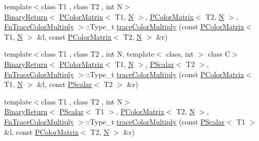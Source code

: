 \begin{DoxyCompactItemize}
\item 
{\footnotesize template$<$class T1 , class T2 , int N$>$ }\\\mbox{\hyperlink{structENSEM_1_1BinaryReturn}{Binary\+Return}}$<$ \mbox{\hyperlink{classENSEM_1_1PColorMatrix}{P\+Color\+Matrix}}$<$ T1, \mbox{\hyperlink{operator__name__util_8cc_a7722c8ecbb62d99aee7ce68b1752f337}{N}} $>$, \mbox{\hyperlink{classENSEM_1_1PColorMatrix}{P\+Color\+Matrix}}$<$ T2, \mbox{\hyperlink{operator__name__util_8cc_a7722c8ecbb62d99aee7ce68b1752f337}{N}} $>$, \mbox{\hyperlink{structENSEM_1_1FnTraceColorMultiply}{Fn\+Trace\+Color\+Multiply}} $>$\+::Type\+\_\+t \mbox{\hyperlink{group__primcolormatrix_ga690c734a59a0c81041165c0fe948ef2d}{trace\+Color\+Multiply}} (const \mbox{\hyperlink{classENSEM_1_1PColorMatrix}{P\+Color\+Matrix}}$<$ T1, \mbox{\hyperlink{operator__name__util_8cc_a7722c8ecbb62d99aee7ce68b1752f337}{N}} $>$ \&l, const \mbox{\hyperlink{classENSEM_1_1PColorMatrix}{P\+Color\+Matrix}}$<$ T2, \mbox{\hyperlink{operator__name__util_8cc_a7722c8ecbb62d99aee7ce68b1752f337}{N}} $>$ \&r)
\item 
{\footnotesize template$<$class T1 , class T2 , int N, template$<$ class, int $>$ class C$>$ }\\\mbox{\hyperlink{structENSEM_1_1BinaryReturn}{Binary\+Return}}$<$ \mbox{\hyperlink{classENSEM_1_1PColorMatrix}{P\+Color\+Matrix}}$<$ T1, \mbox{\hyperlink{operator__name__util_8cc_a7722c8ecbb62d99aee7ce68b1752f337}{N}} $>$, \mbox{\hyperlink{classENSEM_1_1PScalar}{P\+Scalar}}$<$ T2 $>$, \mbox{\hyperlink{structENSEM_1_1FnTraceColorMultiply}{Fn\+Trace\+Color\+Multiply}} $>$\+::Type\+\_\+t \mbox{\hyperlink{group__primcolormatrix_gac1ebb50e5da5705b401fc6a361b951c5}{trace\+Color\+Multiply}} (const \mbox{\hyperlink{classENSEM_1_1PColorMatrix}{P\+Color\+Matrix}}$<$ T1, \mbox{\hyperlink{operator__name__util_8cc_a7722c8ecbb62d99aee7ce68b1752f337}{N}} $>$ \&l, const \mbox{\hyperlink{classENSEM_1_1PScalar}{P\+Scalar}}$<$ T2 $>$ \&r)
\item 
{\footnotesize template$<$class T1 , class T2 , int N$>$ }\\\mbox{\hyperlink{structENSEM_1_1BinaryReturn}{Binary\+Return}}$<$ \mbox{\hyperlink{classENSEM_1_1PScalar}{P\+Scalar}}$<$ T1 $>$, \mbox{\hyperlink{classENSEM_1_1PColorMatrix}{P\+Color\+Matrix}}$<$ T2, \mbox{\hyperlink{operator__name__util_8cc_a7722c8ecbb62d99aee7ce68b1752f337}{N}} $>$, \mbox{\hyperlink{structENSEM_1_1FnTraceColorMultiply}{Fn\+Trace\+Color\+Multiply}} $>$\+::Type\+\_\+t \mbox{\hyperlink{group__primcolormatrix_ga0e0db533c0e6dc778fc9f271537b96eb}{trace\+Color\+Multiply}} (const \mbox{\hyperlink{classENSEM_1_1PScalar}{P\+Scalar}}$<$ T1 $>$ \&l, const \mbox{\hyperlink{classENSEM_1_1PColorMatrix}{P\+Color\+Matrix}}$<$ T2, \mbox{\hyperlink{operator__name__util_8cc_a7722c8ecbb62d99aee7ce68b1752f337}{N}} $>$ \&r)

\end{DoxyCompactItemize}

